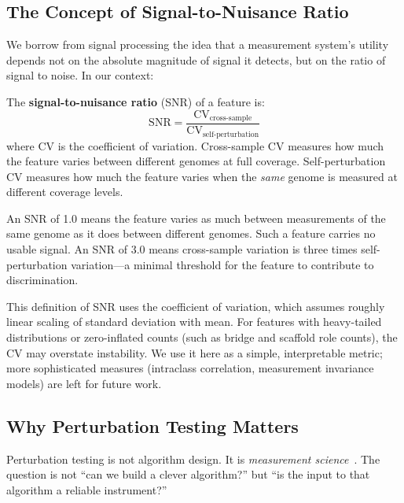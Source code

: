 \documentclass{../yalumba}
\begin{document}
\subsection{The Concept of Signal-to-Nuisance Ratio}

We borrow from signal processing the idea that a measurement system's
utility depends not on the absolute magnitude of signal it detects, but
on the ratio of signal to noise.  In our context:

\begin{definition}
The \textbf{signal-to-nuisance ratio} (SNR) of a feature is:
\begin{equation}
  \text{SNR} = \frac{\text{CV}_{\text{cross-sample}}}
                     {\text{CV}_{\text{self-perturbation}}}
  \label{eq:snr}
\end{equation}
where $\text{CV}$ is the coefficient of variation.  Cross-sample CV
measures how much the feature varies between different genomes at full
coverage.  Self-perturbation CV measures how much the feature varies
when the \emph{same} genome is measured at different coverage levels.
\end{definition}

An SNR of 1.0 means the feature varies as much between measurements
of the same genome as it does between different genomes.  Such a feature
carries no usable signal.  An SNR of 3.0 means cross-sample variation
is three times self-perturbation variation---a minimal threshold for
the feature to contribute to discrimination.

\begin{limitation}
This definition of SNR uses the coefficient of variation, which assumes
roughly linear scaling of standard deviation with mean.  For features
with heavy-tailed distributions or zero-inflated counts (such as bridge
and scaffold role counts), the CV may overstate instability.  We use
it here as a simple, interpretable metric; more sophisticated measures
(intraclass correlation, measurement invariance models) are left for
future work.
\end{limitation}

\subsection{Why Perturbation Testing Matters}

Perturbation testing is not algorithm design.  It is \emph{measurement
science}~\cite{efron1979bootstrap, hennig2007cluster}.  The question is
not ``can we build a clever algorithm?'' but ``is the input to that
algorithm a reliable instrument?''
\end{document}
